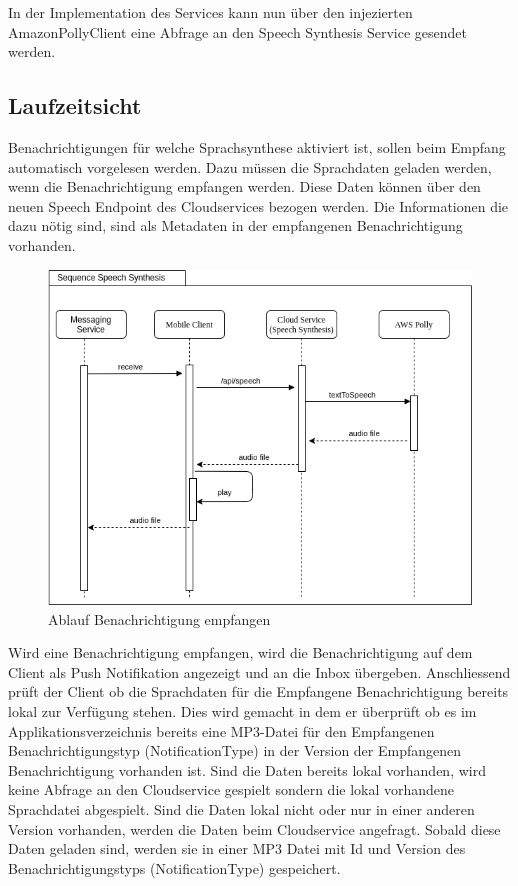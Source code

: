 In der Implementation des Services kann nun über den injezierten AmazonPollyClient eine Abfrage an den Speech Synthesis Service gesendet werden.

\clearpage

\subsection*{Laufzeitsicht}

Benachrichtigungen für welche Sprachsynthese aktiviert ist, sollen beim Empfang automatisch vorgelesen werden.
Dazu müssen die Sprachdaten geladen werden, wenn die Benachrichtigung empfangen werden.
Diese Daten können über den neuen Speech Endpoint des Cloudservices bezogen werden.
Die Informationen die dazu nötig sind, sind als Metadaten in der empfangenen Benachrichtigung vorhanden.

\begin{figure}[h]
    \centering
    \begin{minipage}[b]{0.9\textwidth}
        \includegraphics[width=\textwidth]{graphics/diagramms/Sequence_Speech_Synth_V01}
        \caption{Ablauf Benachrichtigung empfangen}
    \end{minipage}
\end{figure}

Wird eine Benachrichtigung empfangen, wird die Benachrichtigung auf dem Client als Push Notifikation angezeigt und an die Inbox übergeben.
Anschliessend prüft der Client ob die Sprachdaten für die Empfangene Benachrichtigung bereits lokal zur Verfügung stehen.
Dies wird gemacht in dem er überprüft ob es im Applikationsverzeichnis bereits eine MP3-Datei für den Empfangenen Benachrichtigungstyp
(NotificationType) in der Version der Empfangenen Benachrichtigung vorhanden ist.
Sind die Daten bereits lokal vorhanden, wird keine Abfrage an den Cloudservice gespielt sondern die lokal vorhandene Sprachdatei abgespielt.
Sind die Daten lokal nicht oder nur in einer anderen Version vorhanden, werden die Daten beim Cloudservice angefragt.
Sobald diese Daten geladen sind, werden sie in einer MP3 Datei mit Id und Version des Benachrichtigungstyps (NotificationType) gespeichert.

\clearpage
